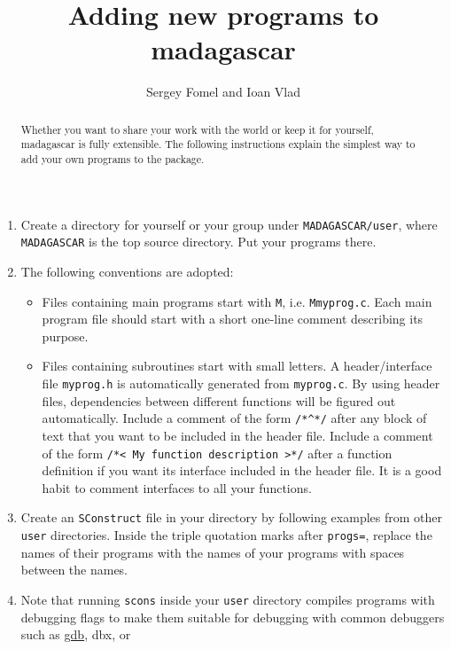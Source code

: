 \title{Adding new programs to madagascar}
\author{Sergey Fomel and Ioan Vlad}
\maketitle

\begin{abstract}
Whether you want to share your work with the world or keep it for
yourself, madagascar is fully extensible. The following instructions
explain the simplest way to add your own programs to the package.
\end{abstract}

\begin{enumerate}
\item Create a directory for yourself or your group under
  \texttt{MADAGASCAR/user}, where \texttt{MADAGASCAR} is the top
  source directory. Put your programs there.
\item The following conventions are adopted:
\begin{itemize}
\item Files containing main programs start with \texttt{M}, i.e.
  \texttt{Mmyprog.c}. Each main program file should start with a short
  one-line comment describing its purpose.
\item Files containing subroutines start with small letters. A
  header/interface file \texttt{myprog.h} is automatically generated
  from \texttt{myprog.c}. By using header files, dependencies between
  different functions will be figured out automatically. Include a
  comment of the form \verb#/*^*/# after any block of text that you
  want to be included in the header file. Include a comment of the
  form \verb#/*< My function description >*/# after a function
  definition if you want its interface included in the header file.
  It is a good habit to comment interfaces to all your functions.
\end{itemize}
\item Create an \texttt{SConstruct} file in your directory by
  following examples from other \texttt{user} directories.  Inside the
  triple quotation marks after \texttt{progs=}, replace the names of
  their programs with the names of your programs with spaces between
  the names.
\item Note that running \texttt{scons} inside your \texttt{user}
  directory compiles programs with debugging flags to make them
  suitable for debugging with common debuggers such as
  \href{http://www.gnu.org/software/gdb/}{gdb}, dbx, or

\end{enumerate}
